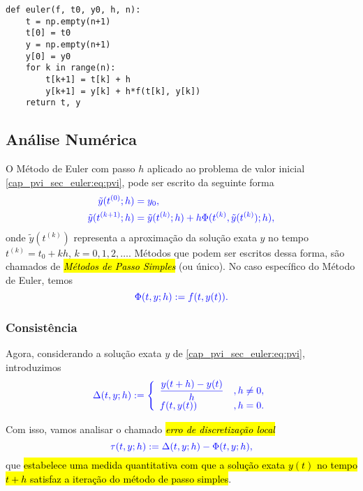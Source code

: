 \begin{lstlisting}[caption=euler.py, label=cap_pvi_sec_euler:cod:euler]
def euler(f, t0, y0, h, n):
    t = np.empty(n+1)
    t[0] = t0
    y = np.empty(n+1)
    y[0] = y0
    for k in range(n):
        t[k+1] = t[k] + h
        y[k+1] = y[k] + h*f(t[k], y[k])
    return t, y
\end{lstlisting}

\subsection{Análise Numérica}

O Método de Euler com passo $h$ aplicado ao problema de valor inicial \eqref{cap_pvi_sec_euler:eq:pvi}, pode ser escrito da seguinte forma
\begin{subequations}\label{cap_pvi_sec_euler:eq:mps}\hleq
  \begin{align}
    \tilde{y}(t^{(0)}; h) &= y_0,\\
    \tilde{y}(t^{(k+1)}; h) &= \tilde{y}(t^{(k)}; h) + h\Phi(t^{(k)}, \tilde{y}(t^{(k)}); h),
  \end{align}
\end{subequations}
onde $\tilde{y}(t^{(k)})$ representa a aproximação da solução exata $y$ no tempo $t^{(k)}=t_0+ kh$, $k=0, 1, 2, \ldots$. Métodos que podem ser escritos dessa forma, são chamados de \hl{\emph{Métodos de Passo Simples}} (ou único). No caso específico do Método de Euler, temos
\begin{equation}\color{blue}\Phi(t, y; h) := f(t, y(t)).
\end{equation}

\subsubsection{Consistência}

Agora, considerando a solução exata $y$ de \eqref{cap_pvi_sec_euler:eq:pvi}, introduzimos
\begin{equation}\color{blue}\Delta(t, y; h) := \left\{
    \begin{array}{ll}
      \displaystyle\frac{y(t+h)-y(t)}{h} &, h\neq 0,\\
      f(t, y(t)) &, h=0.
    \end{array}\right.
\end{equation}

Com isso, vamos analisar o chamado \hl{\emph{erro de discretização local}}
\begin{equation}\color{blue}\tau(t, y; h) := \Delta(t, y; h) - \Phi(t, y; h),
\end{equation}
que \hl{estabelece uma medida quantitativa com que a solução exata $y(t)$ no tempo $t+h$ satisfaz a iteração do método de passo simples}.

